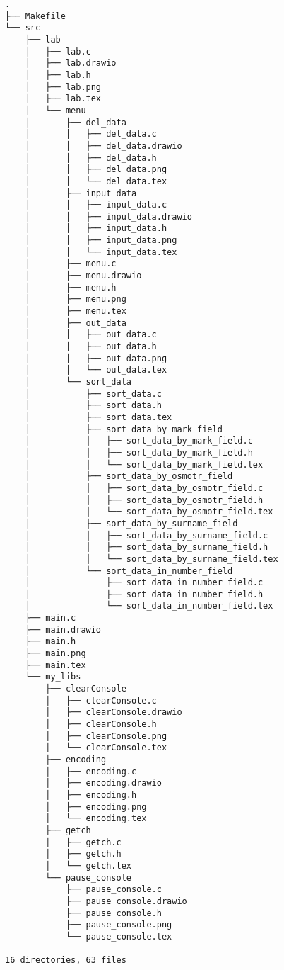 \begin{verbatim}
.
├── Makefile
└── src
    ├── lab
    │   ├── lab.c
    │   ├── lab.drawio
    │   ├── lab.h
    │   ├── lab.png
    │   ├── lab.tex
    │   └── menu
    │       ├── del_data
    │       │   ├── del_data.c
    │       │   ├── del_data.drawio
    │       │   ├── del_data.h
    │       │   ├── del_data.png
    │       │   └── del_data.tex
    │       ├── input_data
    │       │   ├── input_data.c
    │       │   ├── input_data.drawio
    │       │   ├── input_data.h
    │       │   ├── input_data.png
    │       │   └── input_data.tex
    │       ├── menu.c
    │       ├── menu.drawio
    │       ├── menu.h
    │       ├── menu.png
    │       ├── menu.tex
    │       ├── out_data
    │       │   ├── out_data.c
    │       │   ├── out_data.h
    │       │   ├── out_data.png
    │       │   └── out_data.tex
    │       └── sort_data
    │           ├── sort_data.c
    │           ├── sort_data.h
    │           ├── sort_data.tex
    │           ├── sort_data_by_mark_field
    │           │   ├── sort_data_by_mark_field.c
    │           │   ├── sort_data_by_mark_field.h
    │           │   └── sort_data_by_mark_field.tex
    │           ├── sort_data_by_osmotr_field
    │           │   ├── sort_data_by_osmotr_field.c
    │           │   ├── sort_data_by_osmotr_field.h
    │           │   └── sort_data_by_osmotr_field.tex
    │           ├── sort_data_by_surname_field
    │           │   ├── sort_data_by_surname_field.c
    │           │   ├── sort_data_by_surname_field.h
    │           │   └── sort_data_by_surname_field.tex
    │           └── sort_data_in_number_field
    │               ├── sort_data_in_number_field.c
    │               ├── sort_data_in_number_field.h
    │               └── sort_data_in_number_field.tex
    ├── main.c
    ├── main.drawio
    ├── main.h
    ├── main.png
    ├── main.tex
    └── my_libs
        ├── clearConsole
        │   ├── clearConsole.c
        │   ├── clearConsole.drawio
        │   ├── clearConsole.h
        │   ├── clearConsole.png
        │   └── clearConsole.tex
        ├── encoding
        │   ├── encoding.c
        │   ├── encoding.drawio
        │   ├── encoding.h
        │   ├── encoding.png
        │   └── encoding.tex
        ├── getch
        │   ├── getch.c
        │   ├── getch.h
        │   └── getch.tex
        └── pause_console
            ├── pause_console.c
            ├── pause_console.drawio
            ├── pause_console.h
            ├── pause_console.png
            └── pause_console.tex

16 directories, 63 files
\end{verbatim}